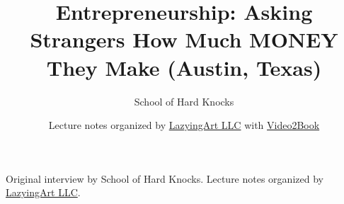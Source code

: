 \documentclass[11pt,oneside]{book}
\begin{document}
\frontmatter
\title{Entrepreneurship: Asking Strangers How Much MONEY They Make (Austin, Texas)}
\author{School of Hard Knocks}
\date{Lecture notes organized by \href{https://lazying.art}{LazyingArt LLC} with \href{https://github.com/lachlanchen/Video2Book}{Video2Book}}
\maketitle
\begin{center}
\small Original interview by School of Hard Knocks. Lecture notes organized by \href{https://lazying.art}{LazyingArt LLC}.
\end{center}
\clearpage
\mainmatter

\end{document}

